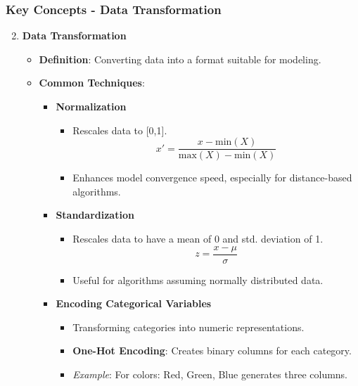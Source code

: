 \documentclass[aspectratio=169]{beamer}
\begin{document}
\begin{frame}[fragile]
    \frametitle{Key Concepts - Data Transformation}
    \begin{enumerate}
        \setcounter{enumi}{1}  %
        \item \textbf{Data Transformation}
        \begin{itemize}
            \item \textbf{Definition}: Converting data into a format suitable for modeling.
            \item \textbf{Common Techniques}:
            \begin{itemize}
                \item \textbf{Normalization}
                \begin{itemize}
                    \item Rescales data to [0,1].
                    \begin{equation}
                    x' = \frac{x - \text{min}(X)}{\text{max}(X) - \text{min}(X)}
                    \end{equation}
                    \item Enhances model convergence speed, especially for distance-based algorithms.
                \end{itemize}
                \item \textbf{Standardization}
                \begin{itemize}
                    \item Rescales data to have a mean of 0 and std. deviation of 1.
                    \begin{equation}
                    z = \frac{x - \mu}{\sigma}
                    \end{equation}
                    \item Useful for algorithms assuming normally distributed data.
                \end{itemize}
                \item \textbf{Encoding Categorical Variables}
                \begin{itemize}
                    \item Transforming categories into numeric representations.
                    \item \textbf{One-Hot Encoding}: Creates binary columns for each category.
                    \item \emph{Example}: For colors: {Red, Green, Blue} generates three columns.
                \end{itemize}
            \end{itemize}
        \end{itemize}
    \end{enumerate}
\end{frame}
\end{document}
